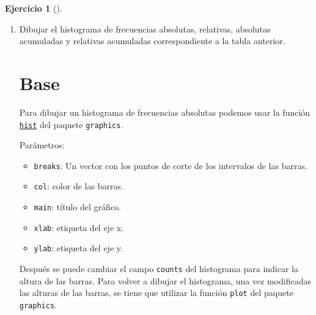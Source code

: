 \documentclass[
  spanish,
  a4paper,
]{scrreport}
\newenvironment{Shaded}{\begin{snugshade}}{\end{snugshade}}
\newcommand{\AttributeTok}[1]{\textcolor[rgb]{0.40,0.45,0.13}{#1}}
\newcommand{\CommentTok}[1]{\textcolor[rgb]{0.37,0.37,0.37}{#1}}
\newcommand{\DecValTok}[1]{\textcolor[rgb]{0.68,0.00,0.00}{#1}}
\newcommand{\FunctionTok}[1]{\textcolor[rgb]{0.28,0.35,0.67}{#1}}
\newcommand{\NormalTok}[1]{\textcolor[rgb]{0.00,0.23,0.31}{#1}}
\newcommand{\OtherTok}[1]{\textcolor[rgb]{0.00,0.23,0.31}{#1}}
\newcommand{\SpecialCharTok}[1]{\textcolor[rgb]{0.37,0.37,0.37}{#1}}
\newcommand{\StringTok}[1]{\textcolor[rgb]{0.13,0.47,0.30}{#1}}
\providecommand{\tightlist}{%
  \setlength{\itemsep}{0pt}\setlength{\parskip}{0pt}}
\theoremstyle{definition}
\newtheorem{exercise}{Ejercicio}[chapter]
\theoremstyle{remark}
\begin{document}
\begin{exercise}[]
\begin{enumerate}
\begin{tcolorbox}
  \end{tcolorbox}
\item
  Dibujar el histograma de frecuencias absolutas, relativas, absolutas
  acumuladas y relativas acumuladas correspondiente a la tabla anterior.

  \begin{tcolorbox}[enhanced jigsaw, titlerule=0mm, arc=.35mm, rightrule=.15mm, opacitybacktitle=0.6, leftrule=.75mm, colframe=quarto-callout-tip-color-frame, toptitle=1mm, breakable, colbacktitle=quarto-callout-tip-color!10!white, bottomrule=.15mm, colback=white, left=2mm, bottomtitle=1mm, opacityback=0, title=\textcolor{quarto-callout-tip-color}{\faLightbulb}\hspace{0.5em}{Solución}, toprule=.15mm, coltitle=black]

  \section{Base}

  Para dibujar un histograma de frecuencias absolutas podemos usar la
  función
  \href{https://www.rdocumentation.org/packages/graphics/versions/3.6.2/topics/hist}{\texttt{hist}}
  del paquete \texttt{graphics}.

  Parámetros:

  \begin{itemize}
  \tightlist
  \item
    \texttt{breaks}: Un vector con los puntos de corte de los intervalos
    de las barras.
  \item
    \texttt{col}: color de las barras.
  \item
    \texttt{main}: título del gráfico.
  \item
    \texttt{xlab}: etiqueta del eje x.
  \item
    \texttt{ylab}: etiqueta del eje y.
  \end{itemize}

  Después se puede cambiar el campo \texttt{counts} del histograma para
  indicar la altura de las barras. Para volver a dibujar el histograma,
  una vez modificadas las alturas de las barras, se tiene que utilizar
  la función \texttt{plot} del paquete \texttt{graphics}.

\begin{Shaded}
\end{Shaded}


\end{tcolorbox}
\end{enumerate}
\end{exercise}
\end{document}
